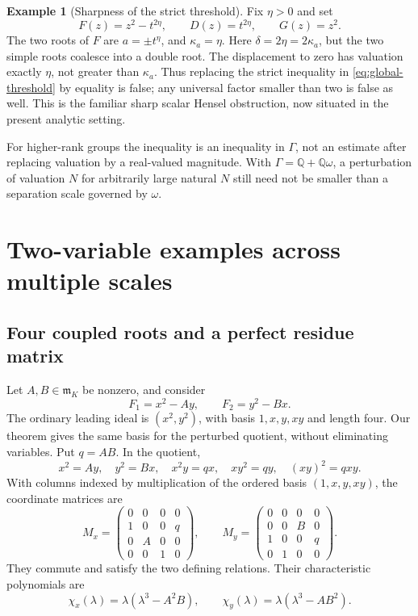 \documentclass[11pt,letterpaper]{article}
\theoremstyle{definition}
\newtheorem{example}[example]{Example}
\theoremstyle{remark}
\newcommand{\Q}{\mathbb Q}
\newcommand{\m}{\mathfrak m}
\numberwithin{equation}{section}
\begin{document}
\begin{example}[Sharpness of the strict threshold]\label{ex:sharpness}
Fix $\eta>0$ and set
\[
 F(z)=z^2-t^{2\eta},\qquad D(z)=t^{2\eta},\qquad G(z)=z^2.
\]
The two roots of $F$ are $a=\pm t^\eta$, and $\kappa_a=\eta$. Here $\delta=2\eta=2\kappa_a$, but the two simple roots coalesce into a double root. The displacement to zero has valuation exactly $\eta$, not greater than $\kappa_a$. Thus replacing the strict inequality in \eqref{eq:global-threshold} by equality is false; any universal factor smaller than two is false as well. This is the familiar sharp scalar Hensel obstruction, now situated in the present analytic setting.
\end{example}

For higher-rank groups the inequality is an inequality in $\Gamma$, not an estimate after replacing valuation by a real-valued magnitude. With $\Gamma=\Q+\Q\omega$, a perturbation of valuation $N$ for arbitrarily large natural $N$ still need not be smaller than a separation scale governed by $\omega$.

\section{Two-variable examples across multiple scales}\label{sec:example}

\subsection{Four coupled roots and a perfect residue matrix}
Let $A,B\in\m_K$ be nonzero, and consider
\begin{equation}\label{eq:four-system}
 F_1=x^2-Ay,\qquad F_2=y^2-Bx.
\end{equation}
The ordinary leading ideal is $(x^2,y^2)$, with basis $1,x,y,xy$ and length four. Our theorem gives the same basis for the perturbed quotient, without eliminating variables. Put $q=AB$. In the quotient,
\[
 x^2=Ay,\quad y^2=Bx,\quad
 x^2y=qx,\quad xy^2=qy,\quad (xy)^2=qxy.
\]
With columns indexed by multiplication of the ordered basis $(1,x,y,xy)$, the coordinate matrices are
\begin{equation}\label{eq:example-matrices}
 M_x=\begin{pmatrix}
 0&0&0&0\\1&0&0&q\\0&A&0&0\\0&0&1&0
 \end{pmatrix},\qquad
 M_y=\begin{pmatrix}
 0&0&0&0\\0&0&B&0\\1&0&0&q\\0&1&0&0
 \end{pmatrix}.
\end{equation}
They commute and satisfy the two defining relations. Their characteristic polynomials are
\begin{equation}\label{eq:example-char}
 \chi_x(\lambda)=\lambda(\lambda^3-A^2B),\qquad
 \chi_y(\lambda)=\lambda(\lambda^3-AB^2).
\end{equation}
\end{document}
